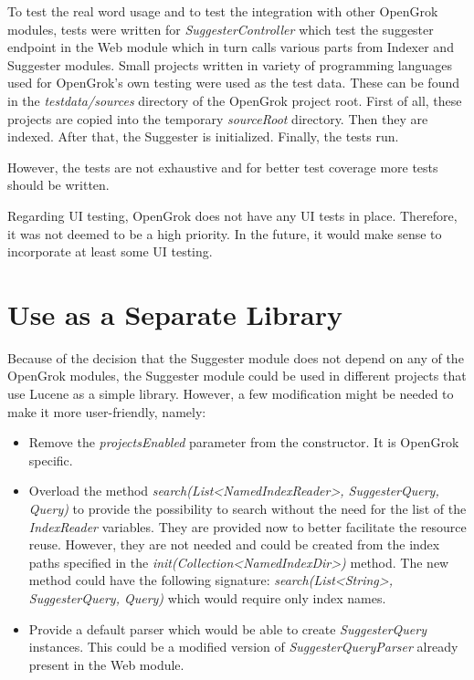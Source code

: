 To test the real word usage and to test the integration with other OpenGrok modules,
tests were written for \textit{SuggesterController} which test the
suggester endpoint in the Web module which in turn calls various parts from Indexer and Suggester modules.
Small projects written in variety of programming languages used for OpenGrok's own testing were used as the test data.
These can be found in the \textit{testdata/sources} directory of the OpenGrok project root.
First of all, these projects are copied into the temporary \textit{sourceRoot} directory. Then they are indexed.
After that, the Suggester is initialized. Finally, the tests run.

However, the tests are not exhaustive and for better test coverage more tests should be written.

Regarding UI testing, OpenGrok does not have any UI tests in place. Therefore, it was not deemed to be a high priority.
In the future, it would make sense to incorporate at least some UI testing.

\section{Use as a Separate Library}
Because of the decision that the Suggester module does not depend on any of the OpenGrok modules, the Suggester module
could be used in different projects that use Lucene as a simple library.
However, a few modification might be needed to make it more user-friendly,
namely:
\begin{itemize}
    \item Remove the \textit{projectsEnabled} parameter from the constructor. It is OpenGrok specific.
    \item Overload the method \textit{search(List\textless NamedIndexReader\textgreater, SuggesterQuery, Query)} to provide
    the possibility to search without the need for the list of the \textit{IndexReader} variables. They are provided now to better
    facilitate the resource reuse. However, they are not needed and could be created from the index paths specified in
    the \textit{init(Collection\textless NamedIndexDir\textgreater)} method. The new method could have the following signature:
    \textit{search(List\textless String\textgreater, SuggesterQuery, Query)} which would require only index names.
    \item Provide a default parser which would be able to create \textit{SuggesterQuery} instances. This could be a
    modified version of \textit{SuggesterQueryParser} already present in the Web module.
\end{itemize}
